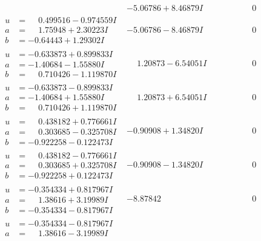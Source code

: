 \documentclass[1p]{elsarticle_modified}
\theoremstyle{definition}
\begin{document}
$$\begin{array}{c|c|c}
 & -5.06786 + 8.46879 I & \phantom{-0.000000 } 0 \\ \hline\begin{aligned}
u &= \phantom{-}0.499516 - 0.974559 I \\
a &= \phantom{-}1.75948 + 2.30223 I \\
b &= -0.64443 + 1.29302 I\end{aligned}
 & -5.06786 - 8.46879 I & \phantom{-0.000000 } 0 \\ \hline\begin{aligned}
u &= -0.633873 + 0.899833 I \\
a &= -1.40684 - 1.55880 I \\
b &= \phantom{-}0.710426 - 1.119870 I\end{aligned}
 & \phantom{-}1.20873 - 6.54051 I & \phantom{-0.000000 } 0 \\ \hline\begin{aligned}
u &= -0.633873 - 0.899833 I \\
a &= -1.40684 + 1.55880 I \\
b &= \phantom{-}0.710426 + 1.119870 I\end{aligned}
 & \phantom{-}1.20873 + 6.54051 I & \phantom{-0.000000 } 0 \\ \hline\begin{aligned}
u &= \phantom{-}0.438182 + 0.776661 I \\
a &= \phantom{-}0.303685 - 0.325708 I \\
b &= -0.922258 - 0.122473 I\end{aligned}
 & -0.90908 + 1.34820 I & \phantom{-0.000000 } 0 \\ \hline\begin{aligned}
u &= \phantom{-}0.438182 - 0.776661 I \\
a &= \phantom{-}0.303685 + 0.325708 I \\
b &= -0.922258 + 0.122473 I\end{aligned}
 & -0.90908 - 1.34820 I & \phantom{-0.000000 } 0 \\ \hline\begin{aligned}
u &= -0.354334 + 0.817967 I \\
a &= \phantom{-}1.38616 + 3.19989 I \\
b &= -0.354334 - 0.817967 I\end{aligned}
 & -8.87842\phantom{ +0.000000I} & \phantom{-0.000000 } 0 \\ \hline\begin{aligned}
u &= -0.354334 - 0.817967 I \\
a &= \phantom{-}1.38616 - 3.19989 I \\

\end{aligned}
\end{array}$$
\end{document}
